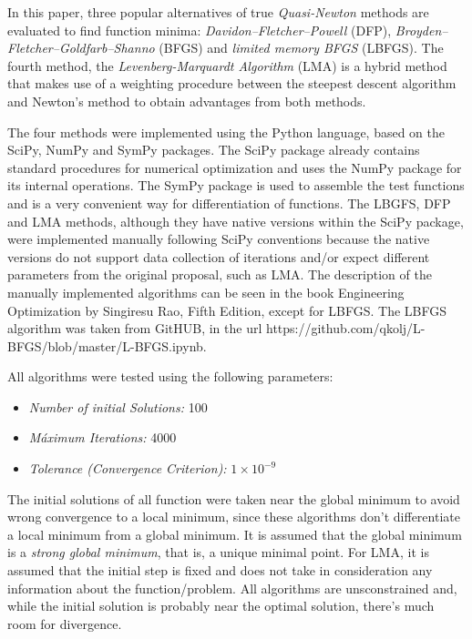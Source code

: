 \documentclass[conference]{IEEEtran}
\begin{document}
In this paper, three popular alternatives of true \textit{Quasi-Newton} methods are evaluated to find function minima: \textit{Davidon–Fletcher–Powell} (DFP), \textit{Broyden–Fletcher–Goldfarb–Shanno} (BFGS) and \textit{limited memory BFGS} (LBFGS). The fourth method, the \textit{Levenberg-Marquardt Algorithm} (LMA) is a hybrid method that makes use of a weighting procedure between the steepest descent algorithm and Newton's method to obtain advantages from both methods.

The four methods were implemented using the Python language, based on the SciPy, NumPy and SymPy packages. The SciPy package already contains standard procedures for numerical optimization and uses the NumPy package for its internal operations. The SymPy package is used to assemble the test functions and is a very convenient way for differentiation of functions. The LBGFS, DFP and LMA methods, although they have native versions within the SciPy package, were implemented manually following SciPy conventions because the native versions do not support data collection of iterations and/or expect different parameters from the original proposal, such as LMA. The description of the manually implemented algorithms can be seen in the book Engineering Optimization by Singiresu Rao, Fifth Edition, except for LBFGS. The LBFGS algorithm was taken from GitHUB, in the url https://github.com/qkolj/L-BFGS/blob/master/L-BFGS.ipynb.

All algorithms were tested using the following parameters:

\begin{itemize}
	\item \textit{Number of initial Solutions:} 100
	\item \textit{Máximum Iterations:} 4000
	\item \textit{Tolerance (Convergence Criterion): } $1 \times 10^{-9}$
\end{itemize}

The initial solutions of all function were taken near the global minimum to avoid wrong convergence to a local minimum, since these algorithms don't differentiate a local minimum from a global minimum. It is assumed that the global minimum is a \textit{strong global minimum}, that is, a unique minimal point. For LMA, it is assumed that the initial step is fixed and does not take in consideration any information about the function/problem. All algorithms are unsconstrained and, while the initial solution is probably near the optimal solution, there's much room for divergence.
\end{document}
